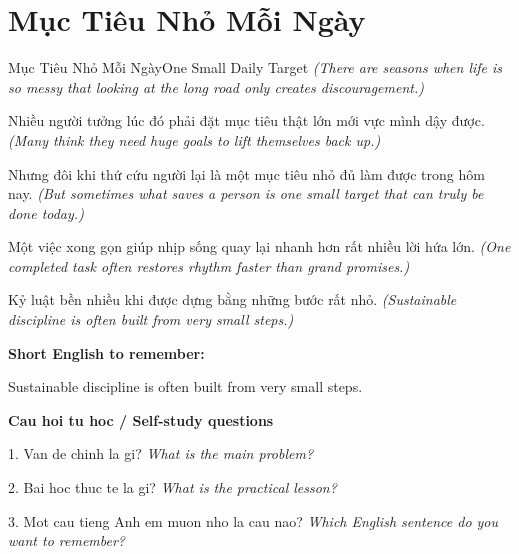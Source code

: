 \section{Mục Tiêu Nhỏ Mỗi Ngày}
\begin{truyen}{Mục Tiêu Nhỏ Mỗi Ngày}{One Small Daily Target}
\textit{(There are seasons when life is so messy that looking at the long road only creates discouragement.)}

Nhiều người tưởng lúc đó phải đặt mục tiêu thật lớn mới vực mình dậy được.
\textit{(Many think they need huge goals to lift themselves back up.)}

Nhưng đôi khi thứ cứu người lại là một mục tiêu nhỏ đủ làm được trong hôm nay.
\textit{(But sometimes what saves a person is one small target that can truly be done today.)}

Một việc xong gọn giúp nhịp sống quay lại nhanh hơn rất nhiều lời hứa lớn.
\textit{(One completed task often restores rhythm faster than grand promises.)}

\end{truyen}

\begin{baihoc}
Kỷ luật bền nhiều khi được dựng bằng những bước rất nhỏ.
\textit{(Sustainable discipline is often built from very small steps.)}
\end{baihoc}

\begin{ghinhoanh}
\textbf{Short English to remember:}

Sustainable discipline is often built from very small steps.

\end{ghinhoanh}

\begin{tuhocnhanh}
\textbf{Cau hoi tu hoc / Self-study questions}

1. Van de chinh la gi? \textit{What is the main problem?}

2. Bai hoc thuc te la gi? \textit{What is the practical lesson?}

3. Mot cau tieng Anh em muon nho la cau nao? \textit{Which English sentence do you want to remember?}
\end{tuhocnhanh}
\ngancach

